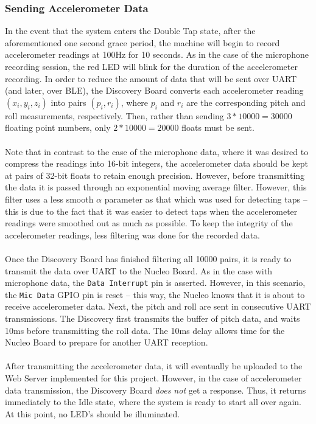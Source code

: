 \subsubsection{Sending Accelerometer Data}
In the event that the system enters the Double Tap state, after the aforementioned one second grace
period, the machine will begin to record accelerometer readings at 100Hz for 10 seconds. As in the
case of the microphone recording session, the red LED will blink for the duration of the
accelerometer recording. In order to reduce the
amount of data that will be sent over UART (and later, over BLE), the Discovery Board converts each
accelerometer reading $(x_i,y_i,z_i)$ into pairs $(p_i,r_i)$, where $p_i$ and $r_i$ are the
corresponding pitch and roll measurements, respectively. Then, rather than sending $3*10000=30000$
floating point numbers, only $2*10000=20000$ floats must be sent.\\\\
Note that in contrast to the case of the microphone data, where it was desired to compress the
readings into 16-bit integers, the accelerometer data should be kept at pairs of 32-bit floats to
retain enough precision. However, before transmitting the data it is passed through an exponential
moving average filter. However, this filter uses a less smooth $\alpha$ parameter as that which was
used for detecting taps -- this is due to the fact that it was easier to detect taps when the
accelerometer readings were smoothed out as much as possible. To keep the integrity of the
accelerometer readings, less filtering was done for the recorded data.\\\\
Once the Discovery Board has finished filtering all 10000 pairs, it is ready to transmit the data
over UART to the Nucleo Board. As in the case with microphone data, the \texttt{Data Interrupt} pin
is asserted. However, in this scenario, the \texttt{Mic Data} GPIO pin is reset -- this way, the
Nucleo knows that it is about to receive accelerometer data. Next, the pitch and roll are sent in
consecutive UART transmissions. The Discovery first transmits the buffer of pitch data, and waits
10ms before transmitting the roll data. The 10ms delay allows time for the Nucleo Board to prepare
for another UART reception.\\\\
After transmitting the accelerometer data, it will eventually be uploaded to the Web Server
implemented for this project. However, in the case of accelerometer data transmission, the Discovery
Board \textit{does not} get a response. Thus, it returns immediately to the Idle state, where the
system is ready to start all over again. At this point, no LED's should be illuminated.
